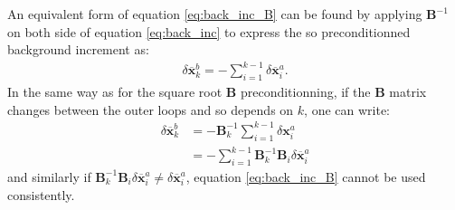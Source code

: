 \documentclass[npg, manuscript]{copernicus}
\begin{document}
An equivalent form of equation \eqref{eq:back_inc_B} can be found by applying $\mathbf{B}^{-1}$ on both side of equation \eqref{eq:back_inc} to express the so preconditionned background increment as:
\begin{align}
\label{eq:back_inc_B}
\delta \overline{\mathbf{x}}^b_k = - \sum_{i=1}^{k-1} \delta \overline{\mathbf{x}}^a_i.
\end{align}
In the same way as for the square root $\mathbf{B}$ preconditionning, if the $\mathbf{B}$ matrix changes between the outer loops and so depends on $k$, one can write:
\begin{align}
\label{eq:back_inc_B_diff}
\delta \overline{\mathbf{x}}^b_k & = - \mathbf{B}_k^{-1}\sum_{i=1}^{k-1} \delta \mathbf{x}^a_i \nonumber \\
& = - \sum_{i=1}^{k-1} \mathbf{B}_k^{-1} \mathbf{B}_i \delta \overline{\mathbf{x}}^a_i
\end{align}
and similarly if $\mathbf{B}_k^{-1} \mathbf{B}_i \delta \overline{\mathbf{x}}^a_i \ne \delta \overline{\mathbf{x}}^a_i$, equation \eqref{eq:back_inc_B} cannot be used consistently.
\end{document}
